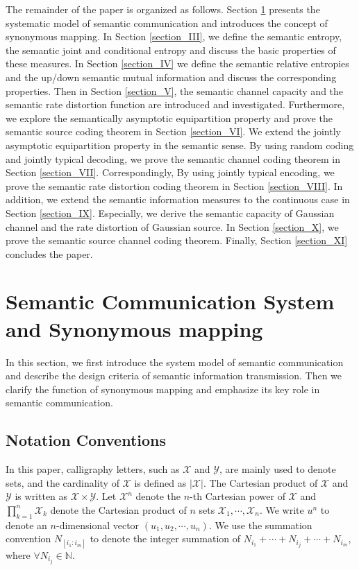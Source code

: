 \documentclass[12pt, draftclsnofoot,onecolumn]{IEEEtran}
\begin{document}
The remainder of the paper is organized as follows. Section \ref{section_II} presents the systematic model of semantic communication and introduces the concept of synonymous mapping. In Section \ref{section_III}, we define the semantic entropy, the semantic joint and conditional entropy and discuss the basic properties of these measures. In Section \ref{section_IV} we define the semantic relative entropies and the up/down semantic mutual information and discuss the corresponding properties. Then in Section \ref{section_V}, the semantic channel capacity and the semantic rate distortion function are introduced and investigated. Furthermore, we explore the semantically asymptotic equipartition property and prove the semantic source coding theorem in Section \ref{section_VI}. We extend the jointly asymptotic equipartition property in the semantic sense. By using random coding and jointly typical decoding, we prove the semantic channel coding theorem in Section \ref{section_VII}. Correspondingly, By using jointly typical encoding, we prove the semantic rate distortion coding theorem in Section \ref{section_VIII}. In addition, we extend the semantic information measures to the continuous case in Section \ref{section_IX}. Especially, we derive the semantic capacity of Gaussian channel and the rate distortion of Gaussian source. In Section \ref{section_X}, we prove the semantic source channel coding theorem. Finally, Section \ref{section_XI} concludes the paper.

\section{Semantic Communication System and Synonymous mapping}
\label{section_II}
In this section, we first introduce the system model of semantic communication and describe the design criteria of semantic information transmission. Then we clarify the function of synonymous mapping and emphasize its key role in semantic communication.

\subsection{Notation Conventions}
In this paper, calligraphy letters, such as $\mathcal{X}$ and $\mathcal{Y}$, are mainly used to denote sets, and the cardinality of $\mathcal{X}$ is defined as $\left|\mathcal{X}\right|$. The Cartesian product of $\mathcal{X}$ and $\mathcal{Y}$ is written as $\mathcal{X}\times \mathcal{Y}$. Let $\mathcal{X}^n$ denote the $n$-th Cartesian power of $\mathcal{X}$ and $\prod_{k=1}^{n}\mathcal{X}_k$ denote the Cartesian product of $n$ sets $\mathcal{X}_1,\cdots,\mathcal{X}_n$. We write $u^n$ to denote an $n$-dimensional vector $\left(u_1,u_2,\cdots,u_n\right)$. We use the summation convention $N_{[i_1:i_m]}$ to denote the integer summation of $N_{i_1}+\cdots+N_{i_j}+\cdots+N_{i_m}$, where $\forall N_{i_j}\in \mathbb{N}$.
\end{document}
